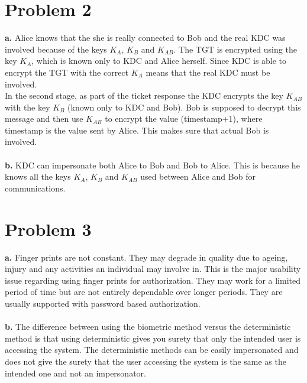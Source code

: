 \documentclass[10pt]{article}
\begin{document}
\section{Problem 2}
\textbf{a.} Alice knows that the she is really connected to Bob and the real KDC was involved because of the keys $K_A$, $K_B$ and $K_{AB}$. The TGT is encrypted using the key $K_A$, which is known only to KDC and Alice herself. Since KDC is able to encrypt the TGT with the correct $K_A$ means that the real KDC must be involved. \\
In the second stage, as part of the ticket response the KDC encrypts the key $K_{AB}$ with the key $K_B$ (known only to KDC and Bob). Bob is supposed to decrypt this message and then use $K_{AB}$ to encrypt the value (timestamp+1), where timestamp is the value sent by Alice. This makes sure that actual Bob is involved.\\\\
\textbf{b.} KDC can impersonate both Alice to Bob and Bob to Alice. This is because he knows all the keys $K_A$, $K_B$ and $K_{AB}$ used between Alice and Bob for communications.\\
\section{Problem 3}
\textbf{a.} Finger prints are not constant. They may degrade in quality due to ageing, injury and any activities an individual may involve in. This is the major usability issue regarding using finger prints for authorization. They may work for a limited period of time but are not entirely dependable over longer periods. They are usually supported with password based authorization.\\\\
\textbf{b.} The difference between using the biometric method versus the deterministic method is that using deterministic gives you surety that only the intended user is accessing the system. The deterministic methods can be easily impersonated and does not give the surety that the user accessing the system is the same as the intended one and not an impersonator.\\
\end{document}
